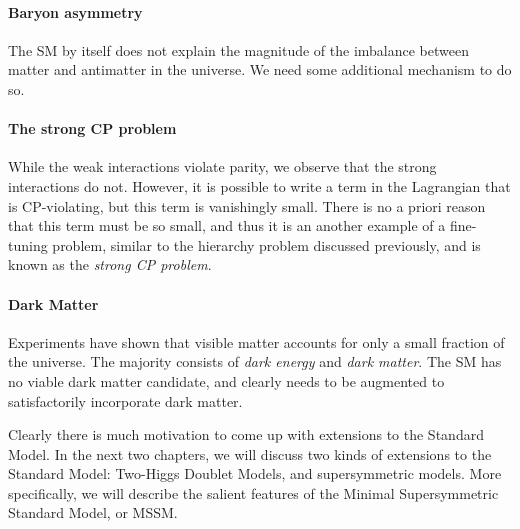 \paragraph{Baryon asymmetry} The SM by itself does not explain the magnitude of the imbalance between matter and antimatter in the universe. We need some additional mechanism to do so.
\paragraph{The strong CP problem} While the weak interactions violate parity, we observe that the strong interactions do not. However, it is possible to write a term in the Lagrangian that is CP-violating, but this term is vanishingly small. There is no a priori reason that this term must be so small, and thus it is an another example of a fine-tuning problem, similar to the hierarchy problem discussed previously, and is known as the \emph{strong CP problem}.
\paragraph{Dark Matter}
Experiments have shown that visible matter accounts for only a small fraction of the universe. The majority consists of \emph{dark energy} and \emph{dark matter}. The SM has no viable dark matter candidate, and clearly needs to be augmented to satisfactorily incorporate dark matter.

Clearly there is much motivation to come up with extensions to the Standard Model. In the next two chapters, we will discuss two kinds of extensions to the Standard Model: Two-Higgs Doublet Models, and supersymmetric models. More specifically, we will describe the salient features of the Minimal Supersymmetric Standard Model, or MSSM.
